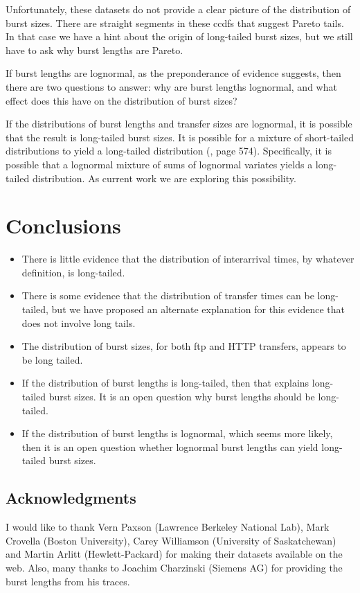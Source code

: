\documentclass[twocolumn,11pt]{infocom}
\begin{document}
Unfortunately, these datasets do not provide a clear picture of
the distribution of burst sizes.  There are straight segments in
these ccdfs that suggest Pareto tails.
In that case
we have a hint about the origin of long-tailed burst sizes,
but we still have to ask why burst lengths are Pareto.

If burst lengths are lognormal, as the preponderance of evidence
suggests, then there are two questions to answer: why are burst
lengths lognormal, and what effect does this have on the distribution
of burst sizes?

If the distributions of burst lengths and transfer sizes are
lognormal, it is possible that the result is long-tailed burst sizes.
It is possible for a mixture of short-tailed distributions to yield a
long-tailed distribution (\cite{JohnsonKotzBalakrishnan94}, page 574).
Specifically, it is possible that a lognormal mixture of sums of
lognormal variates yields a long-tailed distribution.  As current work
we are exploring this possibility.

\section {Conclusions}

\begin {itemize}

\item There is little evidence that the distribution of interarrival
times, by whatever definition, is long-tailed.

\item There is some evidence that the distribution of transfer times
can be long-tailed, but we have proposed an alternate explanation for
this evidence that does not involve long tails.

\item The distribution of burst sizes, for both ftp and HTTP
transfers, appears to be long tailed.

\item If the distribution of burst lengths is long-tailed, then that
explains long-tailed burst sizes.  It is an open question why
burst lengths should be long-tailed.

\item If the distribution of burst lengths is lognormal,
which seems more likely, then it is an open question whether
lognormal burst lengths can yield long-tailed burst sizes.

\end{itemize}


\subsection*{Acknowledgments}

I would like to thank Vern Paxson (Lawrence Berkeley National Lab),
Mark Crovella (Boston University), Carey Williamson (University of
Saskatchewan) and Martin Arlitt (Hewlett-Packard) for making their
datasets available on the web.  Also, many thanks
to Joachim Charzinski (Siemens AG) for providing the burst lengths
from his traces.





\end{document}

